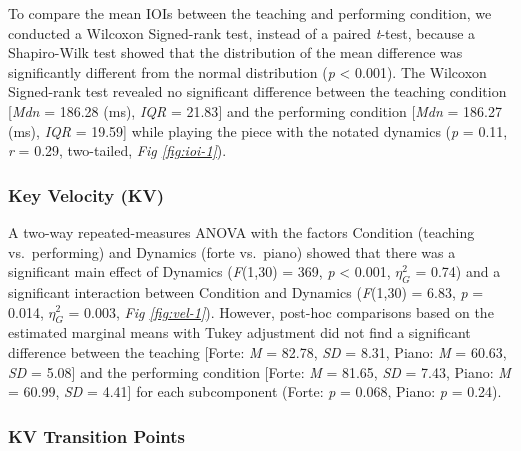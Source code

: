 \documentclass[
  man,floatsintext]{apa6}
\begin{document}
To compare the mean IOIs between the teaching and performing condition, we conducted a Wilcoxon Signed-rank test, instead of a paired \emph{t}-test, because a Shapiro-Wilk test showed that the distribution of the mean difference was significantly different from the normal distribution (\emph{p} \textless{} 0.001). The Wilcoxon Signed-rank test revealed no significant difference between the teaching condition {[}\emph{Mdn} = 186.28 (ms), \emph{IQR} = 21.83{]} and the performing condition {[}\emph{Mdn} = 186.27 (ms), \emph{IQR} = 19.59{]} while playing the piece with the notated dynamics (\emph{p} = 0.11, \emph{r} = 0.29, two-tailed, \emph{Fig \ref{fig:ioi-1}}).

\hypertarget{key-velocity-kv-1}{%
\subsubsection{Key Velocity (KV)}\label{key-velocity-kv-1}}

A two-way repeated-measures ANOVA with the factors Condition (teaching vs.~performing) and Dynamics (forte vs.~piano) showed that there was a significant main effect of Dynamics (\emph{F}(1,30) = 369, \emph{p} \textless{} 0.001, \(\eta_G^2\) = 0.74) and a significant interaction between Condition and Dynamics (\emph{F}(1,30) = 6.83, \emph{p} = 0.014, \(\eta_G^2\) = 0.003, \emph{Fig \ref{fig:vel-1}}). However, post-hoc comparisons based on the estimated marginal means with Tukey adjustment did not find a significant difference between the teaching {[}Forte: \emph{M} = 82.78, \emph{SD} = 8.31, Piano: \emph{M} = 60.63, \emph{SD} = 5.08{]} and the performing condition {[}Forte: \emph{M} = 81.65, \emph{SD} = 7.43, Piano: \emph{M} = 60.99, \emph{SD} = 4.41{]} for each subcomponent (Forte: \emph{p} = 0.068, Piano: \emph{p} = 0.24).

\hypertarget{kv-transition-points}{%
\subsubsection{KV Transition Points}\label{kv-transition-points}}
\end{document}
